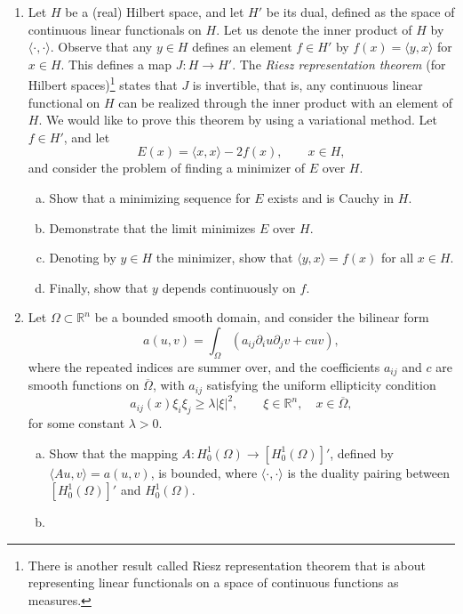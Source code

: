 \documentclass[11pt]{amsart}
\newcommand{\R}{\mathbb{R}}
\begin{document}
\begin{enumerate}[1.]
\begin{enumerate}[a)]
where $\theta$ is the Heaviside step function.
In particular, show that $|u|\in W^{1,p}(\Omega)$ if $u\in W^{1,p}(\Omega)$.
\end{enumerate}
\item %
Let $H$ be a (real) Hilbert space, and let $H'$ be its dual, 
defined as the space of continuous linear functionals on $H$.
Let us denote the inner product of $H$ by $\langle\cdot,\cdot\rangle$.
Observe that any $y\in H$ defines an element $f\in H'$ by $f(x)= \langle y,x\rangle$ for $x\in H$.
This defines a map $J:H\to H'$.
The {\em Riesz representation theorem} (for Hilbert spaces)\footnote{There is another result called Riesz representation theorem that is about representing linear functionals on a space of continuous functions as measures.}
states that $J$ is invertible, that is, any continuous linear functional on $H$ can be realized through the inner product with an element of $H$.
We would like to prove this theorem by using a variational method.
Let $f\in H'$, and let 
$$
E(x) = \langle x,x\rangle - 2f(x),
\qquad x\in H,
$$
and consider the problem of finding a minimizer of $E$ over $H$.
\begin{enumerate}[a)]
\item Show that a minimizing sequence for $E$ exists and is Cauchy in $H$.
\item Demonstrate that the limit minimizes $E$ over $H$.
\item Denoting by $y\in H$ the minimizer, show that $\langle y,x\rangle=f(x)$ for all $x\in H$.
\item Finally, show that $y$ depends continuously on $f$.
\end{enumerate}
\item
Let $\Omega\subset\R^n$ be a bounded smooth  domain, and
consider the bilinear form
$$
a(u,v) = \int_\Omega ( a_{ij}\partial_iu\partial_jv + cuv),
$$
where the repeated indices are summer over, and the coefficients $a_{ij}$ and $c$ are smooth functions on $\overline{\Omega}$,
with $a_{ij}$ satisfying the uniform ellipticity condition
$$
a_{ij}(x)\xi_i\xi_j\geq\lambda |\xi|^2,
\qquad \xi\in\R^n,
\quad x\in\overline\Omega,
$$
for some constant $\lambda>0$.
\begin{enumerate}[a)]
\item
Show that the mapping $A:H^1_0(\Omega)\to[H^1_0(\Omega)]'$, defined by $\langle Au,v\rangle=a(u,v)$, is bounded, where $\langle\cdot,\cdot\rangle$ is the duality pairing between $[H^1_0(\Omega)]'$ and $H^1_0(\Omega)$.
\item

\end{enumerate}
\end{enumerate}
\end{document}
